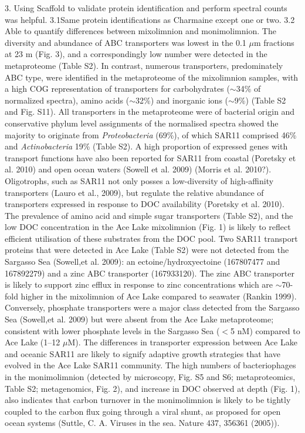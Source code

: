 3. Using Scaffold to validate protein identification and perform spectral counts was helpful. 
3.1Same protein identifications as Charmaine except one or two.
3.2 Able to quantify differences between mixolimnion and monimolimnion.
The diversity and abundance of \ac{ABC} transporters was lowest in the 0.1 $\mu$m fractions at 23 m (Fig. 3), and a correspondingly low number were detected in the metaproteome (Table S2). 
In contrast, numerous transporters, predominately \ac{ABC} type, were identified in the metaproteome of the mixolimnion samples, with a high \ac{COG} representation of transporters for carbohydrates ($\sim$34\% of normalized spectra), amino acids ($\sim$32\%) and inorganic ions ($\sim$9\%) (Table S2 and Fig. S11).
All transporters in the metaproteome were of bacterial origin and conservative phylum level assignments of the normalised spectra showed the majority to originate from \emph{Proteobacteria} (69\%), 
of which SAR11 comprised 46\% and \emph{Actinobacteria} 19\% (Table S2). 
A high proportion of expressed genes with transport functions have also been reported for SAR11 from coastal (Poretsky et al. 2010) and open ocean waters (Sowell et al. 2009) (Morris et al. 2010?). 
Oligotrophs, such as SAR11 not only posses a low-diversity of high-affinity transporters (Lauro et al., 2009), but regulate the relative abundance of transporters expressed in response to \ac{DOC} availability (Poretsky et al. 2010). 
The prevalence of amino acid and simple sugar transporters (Table S2), and the low \ac{DOC} concentration in the Ace Lake mixolimnion (Fig. 1) is likely to reflect efficient utilisation of these substrates from the \ac{DOC} pool. 
Two SAR11 transport proteins that were detected in Ace Lake (Table S2) were not detected from the Sargasso Sea (Sowell,et al. 2009): an ectoine/hydroxyectoine (167807477 and 167892279) and a zinc \ac{ABC} transporter (167933120). The zinc \ac{ABC} transporter is likely to support zinc efflux in response to zinc concentrations which are $\sim$70-fold higher in the mixolimnion of Ace Lake compared to seawater (Rankin 1999). 
Conversely, phosphate transporters were a major class detected from the Sargasso Sea (Sowell,et al. 2009) but were absent from the Ace Lake metaproteome; consistent with lower phosphate levels in the Sargasso Sea ($<$5 nM) compared to Ace Lake (1--12 $\mu$M). The differences in transporter expression between Ace Lake and oceanic SAR11 are likely to signify adaptive growth strategies that have evolved in the Ace Lake SAR11 community.
The high numbers of bacteriophages in the monimolimnion (detected by microscopy, Fig. S5 and S6; metaproteomics, Table S2; metagenomics, Fig. 2), and increase in \ac{DOC} observed at depth (Fig. 1), also indicates that carbon turnover in the monimolimnion is likely to be tightly coupled to the carbon flux going through a viral shunt, as proposed for open ocean systems (Suttle, C. A. Viruses in the sea. Nature 437, 356361 (2005)). 
